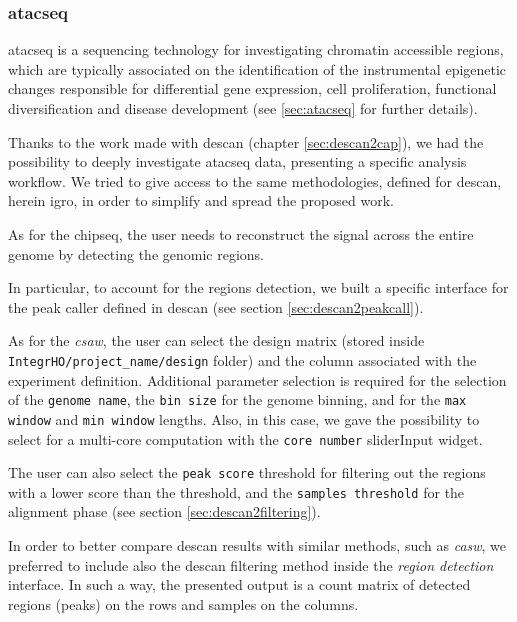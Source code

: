 \subsubsection{\gls{atacseq}} \label{sec:integrhoatac}

\gls{atacseq} is a sequencing technology for investigating chromatin accessible regions, which are typically associated on the identification of the instrumental epigenetic changes responsible for differential gene expression, cell proliferation, functional diversification and disease development (see \ref{sec:atacseq} for further details).

Thanks to the work made with \gls{descan} (chapter \ref{sec:descan2cap}), we had the possibility to deeply investigate \gls{atacseq} data, presenting a specific analysis workflow.
We tried to give access to the same methodologies, defined for \gls{descan}, herein \gls{igro}, in order to simplify and spread the proposed work.

As for the \gls{chipseq}, the user needs to reconstruct the signal across the entire genome by detecting the genomic regions.

In particular, to account for the regions detection, we built a specific interface for the peak caller defined in \gls{descan} (see section \ref{sec:descan2peakcall}).

As for the \textit{csaw}, the user can select the design matrix (stored inside \lstinline!IntegrHO/project_name/design! folder) and the column associated with the experiment definition.
Additional parameter selection is required for the selection of the \lstinline!genome name!, the \lstinline!bin size! for the genome binning, and for the \lstinline!max window! and \lstinline!min window! lengths.
Also, in this case, we gave the possibility to select for a multi-core computation with the \lstinline!core number! sliderInput widget.

The user can also select the \lstinline!peak score! threshold for filtering out the regions with a lower score than the threshold, and the \lstinline!samples threshold! for the alignment phase (see section \ref{sec:descan2filtering}).

In order to better compare \gls{descan} results with similar methods, such as \textit{casw}, we preferred to include also the \gls{descan} filtering method inside the \textit{region detection} interface.
In such a way, the presented output is a count matrix of detected regions (peaks) on the rows and samples on the columns.

